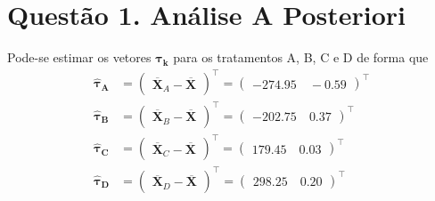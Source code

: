 \section*{\textbf{Questão 1.} Análise A Posteriori}

Pode-se estimar os vetores $\boldsymbol{\tau_{k}}$ para os tratamentos A, B, C e D de forma que
\begin{align*}
    \boldsymbol{\widehat{\tau}_{A}} & = \begin{pmatrix} \overline{\boldsymbol{X}}_{A} - \overline{\boldsymbol{X}} \end{pmatrix}^{\intercal} = \begin{pmatrix} -274.95 \quad -0.59 \end{pmatrix}^{\intercal} \\
    \boldsymbol{\widehat{\tau}_{B}} & = \begin{pmatrix} \overline{\boldsymbol{X}}_{B} - \overline{\boldsymbol{X}} \end{pmatrix}^{\intercal} = \begin{pmatrix} -202.75 \quad 0.37 \end{pmatrix}^{\intercal} \\
    \boldsymbol{\widehat{\tau}_{C}} & = \begin{pmatrix} \overline{\boldsymbol{X}}_{C} - \overline{\boldsymbol{X}} \end{pmatrix}^{\intercal} = \begin{pmatrix} 179.45 \quad 0.03 \end{pmatrix}^{\intercal} \\
    \boldsymbol{\widehat{\tau}_{D}} & = \begin{pmatrix} \overline{\boldsymbol{X}}_{D} - \overline{\boldsymbol{X}} \end{pmatrix}^{\intercal} = \begin{pmatrix} 298.25 \quad 0.20 \end{pmatrix}^{\intercal}
\end{align*}

